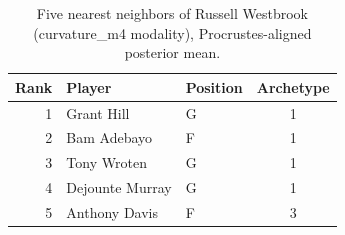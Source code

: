 \begin{table}[htbp]
  \centering\small
  \begin{tabular}{rllc}
    \toprule
    Rank & Player & Position & Archetype \\
    \midrule
    1 & Grant Hill & G & 1 \\
    2 & Bam Adebayo & F & 1 \\
    3 & Tony Wroten & G & 1 \\
    4 & Dejounte Murray & G & 1 \\
    5 & Anthony Davis & F & 3 \\
    \bottomrule
  \end{tabular}
  \caption{Five nearest neighbors of Russell Westbrook (curvature_m4 modality), Procrustes-aligned posterior mean.}
  \label{tab:Russell_Westbrook_neighbors_curvature_m4}
\end{table}


